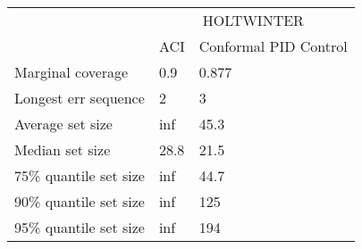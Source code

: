 \begin{tabular}{lll}
\toprule
& \multicolumn{2}{c}{HOLTWINTER} \\
& ACI & Conformal PID Control \\
\midrule
Marginal coverage & 0.9 & 0.877 \\
Longest err sequence & 2 & 3 \\
Average set size & inf & 45.3 \\
Median set size & 28.8 & 21.5 \\
75\% quantile set size & inf & 44.7 \\
90\% quantile set size & inf & 125 \\
95\% quantile set size & inf & 194 \\
\bottomrule
\end{tabular}
